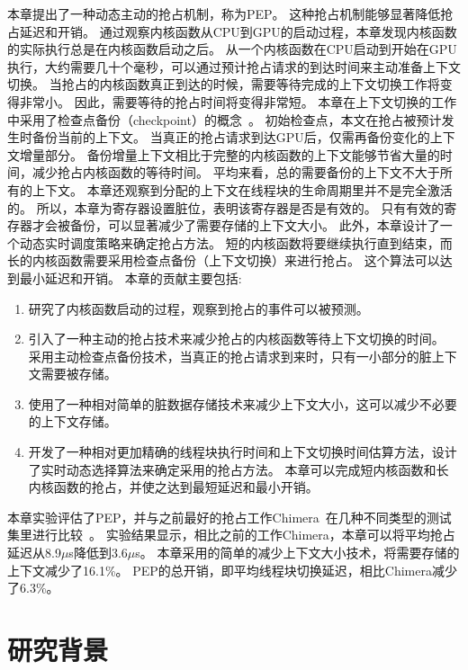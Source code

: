 本章提出了一种动态主动的抢占机制，称为PEP。
这种抢占机制能够显著降低抢占延迟和开销。
通过观察内核函数从CPU到GPU的启动过程，本章发现内核函数的实际执行总是在内核函数启动之后。
从一个内核函数在CPU启动到开始在GPU执行，大约需要几十个毫秒，可以通过预计抢占请求的到达时间来主动准备上下文切换。
当抢占的内核函数真正到达的时候，需要等待完成的上下文切换工作将变得非常小。
因此，需要等待的抢占时间将变得非常短。
本章在上下文切换的工作中采用了检查点备份（checkpoint）的概念~。
初始检查点，本文在抢占被预计发生时备份当前的上下文。
当真正的抢占请求到达GPU后，仅需再备份变化的上下文增量部分。
备份增量上下文相比于完整的内核函数的上下文能够节省大量的时间，减少抢占内核函数的等待时间。
平均来看，总的需要备份的上下文不大于所有的上下文。
本章还观察到分配的上下文在线程块的生命周期里并不是完全激活的。
所以，本章为寄存器设置脏位，表明该寄存器是否是有效的。
只有有效的寄存器才会被备份，可以显著减少了需要存储的上下文大小。
此外，本章设计了一个动态实时调度策略来确定抢占方法。
短的内核函数将要继续执行直到结束，而长的内核函数需要采用检查点备份（上下文切换）来进行抢占。
这个算法可以达到最小延迟和开销。
本章的贡献主要包括:
\renewcommand*\theenumi{(\alph{enumi})}
\begin{enumerate}
\setlength\itemsep{1pt}
\item 研究了内核函数启动的过程，观察到抢占的事件可以被预测。
\item 引入了一种主动的抢占技术来减少抢占的内核函数等待上下文切换的时间。
采用主动检查点备份技术，当真正的抢占请求到来时，只有一小部分的脏上下文需要被存储。
\item 使用了一种相对简单的脏数据存储技术来减少上下文大小，这可以减少不必要的上下文存储。
\item 开发了一种相对更加精确的线程块执行时间和上下文切换时间估算方法，设计了实时动态选择算法来确定采用的抢占方法。
本章可以完成短内核函数和长内核函数的抢占，并使之达到最短延迟和最小开销。
\end{enumerate}

本章实验评估了PEP，并与之前最好的抢占工作Chimera~在几种不同类型的测试集里进行比较~。
实验结果显示，相比之前的工作Chimera，本章可以将平均抢占延迟从8.9$\mu$s降低到3.6$\mu$s。
本章采用的简单的减少上下文大小技术，将需要存储的上下文减少了16.1\%。
PEP的总开销，即平均线程块切换延迟，相比Chimera减少了6.3\%。

\section{研究背景}
\label{sec:pepbackground}


